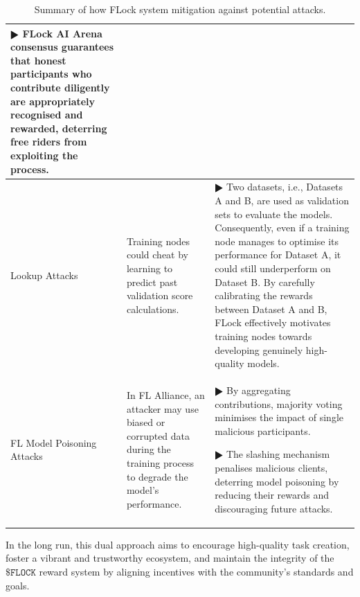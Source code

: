 \documentclass[conference]{IEEEtran}
\newcommand{\FML}{\ensuremath{\xspace\texttt{\$FLOCK}}\xspace}
\begin{document}
\begin{table}[htbp]
{\begin{tabular}{p{2.5cm}|p{6.5cm}|p{9cm}}
{$\RHD$ FLock AI Arena consensus guarantees that
honest participants who contribute diligently are appropriately recognised and rewarded, deterring free riders
from exploiting the process.}\\

\hline

Lookup Attacks& Training nodes could cheat by learning to predict past validation score calculations. & {$\RHD$ Two datasets, i.e., Datasets A and B, are used as validation sets to evaluate the models.  Consequently, even if a training node manages to optimise its performance for Dataset A, it could still underperform on Dataset B. By carefully calibrating the rewards between Dataset A and B, FLock effectively motivates training nodes towards developing genuinely high-quality models.}\\
\hline

FL Model Poisoning Attacks &In FL Alliance, an attacker may use biased or corrupted data during the training process to degrade the model's performance.
& {$\RHD$ 
By aggregating contributions, majority voting minimises the impact of single malicious participants.

$\RHD$
The slashing mechanism penalises malicious clients, deterring model poisoning by reducing their rewards and discouraging future attacks.
}\\

\bottomrule

\end{tabular}
}
    \caption{Summary of how FLock system mitigation against potential attacks.}
    \label{tab:security}
\end{table}



In the long run, this dual approach aims to encourage high-quality task creation, foster a vibrant and trustworthy ecosystem, and maintain the integrity of the \FML reward system by aligning incentives with the community’s standards and goals.
\end{document}
